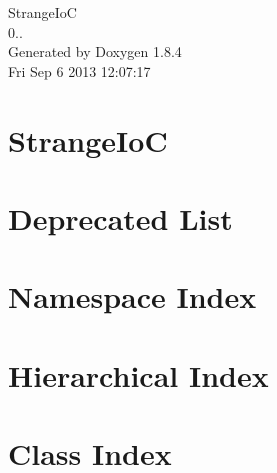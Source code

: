 \documentclass[twoside]{book}
\newcommand{\clearemptydoublepage}{%
  \newpage{\pagestyle{empty}\cleardoublepage}%
}
\begin{document}
\hypersetup{pageanchor=false}
\begin{titlepage}
\vspace*{7cm}
\begin{center}%
{\Large Strange\-Io\-C \\[1ex]\large 0.. }\\
\vspace*{1cm}
{\large Generated by Doxygen 1.8.4}\\
\vspace*{0.5cm}
{\small Fri Sep 6 2013 12:07:17}\\
\end{center}
\end{titlepage}
\clearemptydoublepage
\tableofcontents
\clearemptydoublepage
{}
\hypersetup{pageanchor=true}

\chapter{Strange\-Io\-C}
\label{index}\hypertarget{index}{}
\chapter{Deprecated List}
\label{deprecated}
\hypertarget{deprecated}{}

\chapter{Namespace Index}

\chapter{Hierarchical Index}

\chapter{Class Index}

\end{document}
